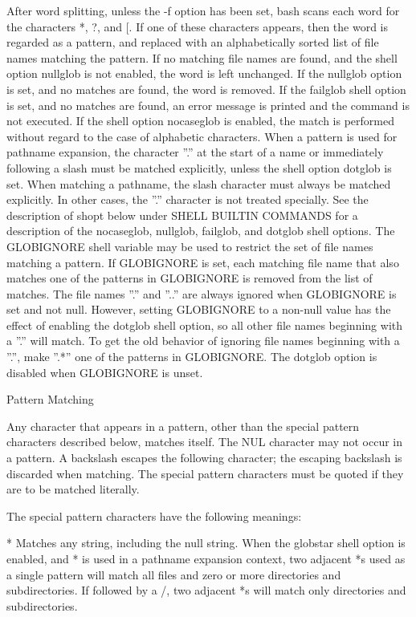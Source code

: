 {{{After word splitting, unless the -f option has been set, bash scans each word for the characters *, ?, and [. If one of these characters appears, then the word is regarded as a pattern, and replaced with an alphabetically sorted list of file names matching the pattern. If no matching file names are found, and the shell option nullglob is not enabled, the word is left unchanged. If the nullglob option is set, and no matches are found, the word is removed. If the failglob shell option is set, and no matches are found, an error message is printed and the command is not executed. If the shell option nocaseglob is enabled, the match is performed without regard to the case of alphabetic characters. When a pattern is used for pathname expansion, the character ''.'' at the start of a name or immediately following a slash must be matched explicitly, unless the shell option dotglob is set. When matching a pathname, the slash character must always be matched explicitly. In other cases, the ''.'' character is not treated specially. See the description of shopt below under SHELL BUILTIN COMMANDS for a description of the nocaseglob, nullglob, failglob, and dotglob shell options.
The GLOBIGNORE shell variable may be used to restrict the set of file names matching a pattern. If GLOBIGNORE is set, each matching file name that also matches one of the patterns in GLOBIGNORE is removed from the list of matches. The file names ''.'' and ''..'' are always ignored when GLOBIGNORE is set and not null. However, setting GLOBIGNORE to a non-null value has the effect of enabling the dotglob shell option, so all other file names beginning with a ''.'' will match. To get the old behavior of ignoring file names beginning with a ''.'', make ''.*'' one of the patterns in GLOBIGNORE. The dotglob option is disabled when GLOBIGNORE is unset.

Pattern Matching

Any character that appears in a pattern, other than the special pattern characters described below, matches itself. The NUL character may not occur in a pattern. A backslash escapes the following character; the escaping backslash is discarded when matching. The special pattern characters must be quoted if they are to be matched literally.

The special pattern characters have the following meanings:

*
Matches any string, including the null string. When the globstar shell option is enabled, and * is used in a pathname expansion context, two adjacent *s used as a single pattern will match all files and zero or more directories and subdirectories. If followed by a /, two adjacent *s will match only directories and subdirectories.

}}}
